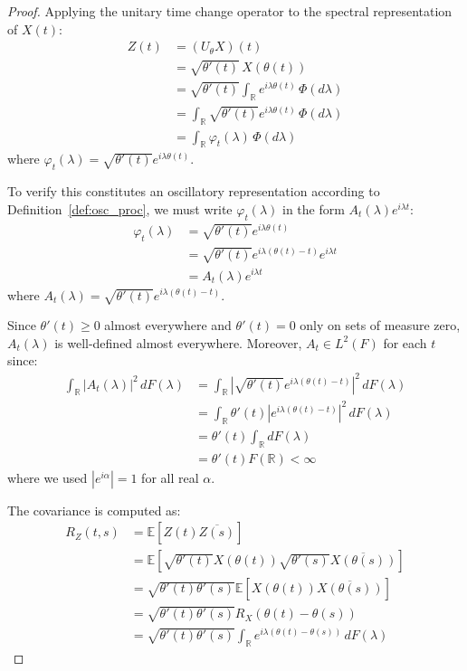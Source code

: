 \documentclass{article}
\begin{document}
\begin{proof}
Applying the unitary time change operator to the spectral representation of $X(t)$:
\begin{align}
Z(t) &= (U_\theta X)(t)\\
&= \sqrt{\theta'(t)}\,X(\theta(t))\\
&= \sqrt{\theta'(t)} \int_{\mathbb{R}} e^{i\lambda\theta(t)}\,\Phi(d\lambda)\\
&= \int_{\mathbb{R}} \sqrt{\theta'(t)}e^{i\lambda\theta(t)}\,\Phi(d\lambda)\\
&= \int_{\mathbb{R}} \varphi_t(\lambda)\,\Phi(d\lambda)
\end{align}
where $\varphi_t(\lambda)=\sqrt{\theta'(t)}e^{i\lambda\theta(t)}$.

To verify this constitutes an oscillatory representation according to Definition~\ref{def:osc_proc}, we must write $\varphi_t(\lambda)$ in the form $A_t(\lambda)e^{i\lambda t}$:
\begin{align}
\varphi_t(\lambda) &= \sqrt{\theta'(t)}e^{i\lambda\theta(t)}\\
&= \sqrt{\theta'(t)}e^{i\lambda(\theta(t)-t)}e^{i\lambda t}\\
&= A_t(\lambda)e^{i\lambda t}
\end{align}
where $A_t(\lambda)=\sqrt{\theta'(t)}e^{i\lambda(\theta(t)-t)}$.

Since $\theta'(t)\geq 0$ almost everywhere and $\theta'(t)=0$ only on sets of measure zero, $A_t(\lambda)$ is well-defined almost everywhere. Moreover, $A_t\in L^2(F)$ for each $t$ since:
\begin{align}
\int_{\mathbb{R}} |A_t(\lambda)|^2\,dF(\lambda) &= \int_{\mathbb{R}} \left|\sqrt{\theta'(t)}e^{i\lambda(\theta(t)-t)}\right|^2\,dF(\lambda)\\
&= \int_{\mathbb{R}} \theta'(t)|e^{i\lambda(\theta(t)-t)}|^2\,dF(\lambda)\\
&= \theta'(t)\int_{\mathbb{R}} dF(\lambda)\\
&= \theta'(t)F(\mathbb{R}) < \infty
\end{align}
where we used $|e^{i\alpha}|=1$ for all real $\alpha$.

The covariance is computed as:
\begin{align}
R_Z(t,s) &= \mathbb{E}[Z(t)\overline{Z(s)}]\\
&= \mathbb{E}\left[\sqrt{\theta'(t)}X(\theta(t))\sqrt{\theta'(s)}\overline{X(\theta(s))}\right]\\
&= \sqrt{\theta'(t)\theta'(s)}\mathbb{E}[X(\theta(t))\overline{X(\theta(s))}]\\
&= \sqrt{\theta'(t)\theta'(s)}R_X(\theta(t)-\theta(s))\\
&= \sqrt{\theta'(t)\theta'(s)}\int_{\mathbb{R}} e^{i\lambda(\theta(t)-\theta(s))}\,dF(\lambda)
\end{align}
\end{proof}
\end{document}
